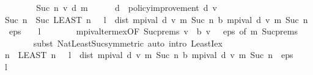 \begin{isabellebody}
\ \ \isamarkupfalse%
\isanewline
\ \ \ \ \isamarkupfalse%
\ {\isacharparenleft}{\kern0pt}Suc\ n\ v\ d\ m{\isacharparenright}{\kern0pt}\isanewline
\ \ \ \ \isamarkupfalse%
\ {\isacharquery}{\kern0pt}d\ {\isacharequal}{\kern0pt}\ {\isachardoublequoteopen}policy{\isacharunderscore}{\kern0pt}improvement\ d\ v{\isachardoublequoteclose}\isanewline
\ \ \ \ \isamarkupfalse%
\ {\isachardoublequoteopen}Suc\ n\ {\isacharequal}{\kern0pt}\ Suc\ {\isacharparenleft}{\kern0pt}LEAST\ n{\isachardot}{\kern0pt}\ {}\ {\isacharasterisk}{\kern0pt}\ l\ {\isacharasterisk}{\kern0pt}\ dist\ {\isacharparenleft}{\kern0pt}mpi{\isacharunderscore}{\kern0pt}val\ d\ v\ m\ {\isacharparenleft}{\kern0pt}Suc\ n{\isacharparenright}{\kern0pt}{\isacharparenright}{\kern0pt}\ {\isacharparenleft}{\kern0pt}{\isasymL}\isactrlsub b\ {\isacharparenleft}{\kern0pt}mpi{\isacharunderscore}{\kern0pt}val\ d\ v\ m\ {\isacharparenleft}{\kern0pt}Suc\ n{\isacharparenright}{\kern0pt}{\isacharparenright}{\kern0pt}{\isacharparenright}{\kern0pt}\ {\isacharless}{\kern0pt}\ eps\ {\isacharasterisk}{\kern0pt}\ {\isacharparenleft}{\kern0pt}{}\ {\isacharminus}{\kern0pt}\ l{\isacharparenright}{\kern0pt}{\isacharparenright}{\kern0pt}{\isachardoublequoteclose}\isanewline
\ \ \ \ \ \ \isamarkupfalse%
\ mpi{\isacharunderscore}{\kern0pt}val{\isacharunderscore}{\kern0pt}term{\isacharunderscore}{\kern0pt}ex{\isacharbrackleft}{\kern0pt}OF\ Suc{\isachardot}{\kern0pt}prems{\isacharparenleft}{\kern0pt}{}{\isacharparenright}{\kern0pt}\ {\isacartoucheopen}v\ {\isasymle}\ {\isasymL}\isactrlsub b\ v{\isacartoucheclose}\ {\isacartoucheopen}{}\ {\isacharless}{\kern0pt}\ eps{\isacartoucheclose}{\isacharcomma}{\kern0pt}\ of\ m{\isacharbrackright}{\kern0pt}\ Suc{\isachardot}{\kern0pt}prems\ \isanewline
\ \ \ \ \ \ \isamarkupfalse%
\ {\isacharparenleft}{\kern0pt}subst\ Nat{\isachardot}{\kern0pt}Least{\isacharunderscore}{\kern0pt}Suc{\isacharbrackleft}{\kern0pt}symmetric{\isacharbrackright}{\kern0pt}{\isacharparenright}{\kern0pt}\ {\isacharparenleft}{\kern0pt}auto\ intro{\isacharcolon}{\kern0pt}\ LeastI{\isacharunderscore}{\kern0pt}ex{\isacharparenright}{\kern0pt}\isanewline
\ \ \ \ \isamarkupfalse%
\ {\isachardoublequoteopen}n\ {\isacharequal}{\kern0pt}\ {\isacharparenleft}{\kern0pt}LEAST\ n{\isachardot}{\kern0pt}\ {}\ {\isacharasterisk}{\kern0pt}\ l\ {\isacharasterisk}{\kern0pt}\ dist\ {\isacharparenleft}{\kern0pt}mpi{\isacharunderscore}{\kern0pt}val\ d\ v\ m\ {\isacharparenleft}{\kern0pt}Suc\ n{\isacharparenright}{\kern0pt}{\isacharparenright}{\kern0pt}\ {\isacharparenleft}{\kern0pt}{\isasymL}\isactrlsub b\ {\isacharparenleft}{\kern0pt}mpi{\isacharunderscore}{\kern0pt}val\ d\ v\ m\ {\isacharparenleft}{\kern0pt}Suc\ n{\isacharparenright}{\kern0pt}{\isacharparenright}{\kern0pt}{\isacharparenright}{\kern0pt}\ {\isacharless}{\kern0pt}\ eps\ {\isacharasterisk}{\kern0pt}\ {\isacharparenleft}{\kern0pt}{}\ {\isacharminus}{\kern0pt}\ l{\isacharparenright}{\kern0pt}{\isacharparenright}{\kern0pt}{\isachardoublequoteclose}\isanewline

\end{isabellebody}
